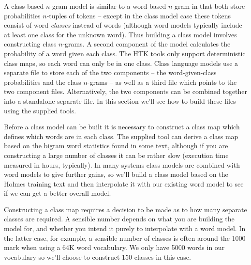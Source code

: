 A class-based $n$-gram model is similar to a word-based $n$-gram in
that both store probabilities $n$-tuples of tokens -- except in the
class model case these tokens consist of word {\it classes} instead of
words (although word models typically include at least one class for
the unknown word).  Thus building a class model involves constructing
class $n$-grams.  A second component of the model calculates the
probability of a word given each class.  The HTK tools only support
deterministic class maps, so each word can only be in one class.
Class language models use a separate file to store each of the two
components -- the word-given-class probabilities and the class
$n$-grams -- as well as a third file which points to the two component
files.  Alternatively, the two components can be combined together
into a standalone separate file.  In this section we'll see how to
build these files using the supplied tools.

Before a class model can be built it is necessary to construct a class
map which defines which words are in each class.  The supplied
 tool can derive a class map based on the bigram word
statistics found in some text, although if you are constructing a
large number of classes it can be rather slow (execution time measured
in hours, typically).  In many systems class models are combined with
word models to give further gains, so we'll build a class model based
on the Holmes training text and then interpolate it with our existing
word model to see if we can get a better overall model.

Constructing a class map requires a decision to be made as to how many
separate classes are required.  A sensible number depends on what you
are building the model for, and whether you intend it purely to
interpolate with a word model.  In the latter case, for example, a
sensible number of classes is often around the 1000 mark when using a
64K word vocabulary.  We only have 5000 words in our vocabulary so
we'll choose to construct 150 classes in this case.

